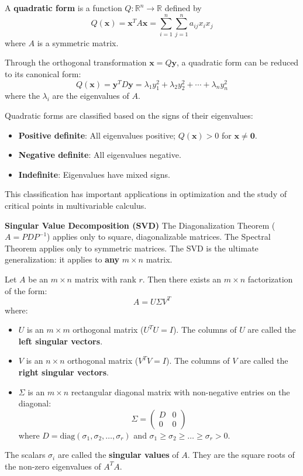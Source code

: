 \begin{definition}
A \textbf{quadratic form} is a function $Q: \mathbb{R}^n \to \mathbb{R}$ defined by
\[
Q(\mathbf{x}) = \mathbf{x}^T A \mathbf{x} = \sum_{i=1}^n \sum_{j=1}^n a_{ij} x_i x_j
\]
where $A$ is a symmetric matrix.
\end{definition}

Through the orthogonal transformation $\mathbf{x} = Q\mathbf{y}$, a quadratic form can be reduced to its canonical form:
\[
Q(\mathbf{x}) = \mathbf{y}^T D \mathbf{y} = \lambda_1 y_1^2 + \lambda_2 y_2^2 + \cdots + \lambda_n y_n^2
\]
where the $\lambda_i$ are the eigenvalues of $A$.

Quadratic forms are classified based on the signs of their eigenvalues:
\begin{itemize}
    \item \textbf{Positive definite}: All eigenvalues positive; $Q(\mathbf{x}) > 0$ for $\mathbf{x} \neq \mathbf{0}$.
    \item \textbf{Negative definite}: All eigenvalues negative.
    \item \textbf{Indefinite}: Eigenvalues have mixed signs.
\end{itemize}

This classification has important applications in optimization and the study of critical points in multivariable calculus.


\textbf{Singular Value Decomposition (SVD)}
The Diagonalization Theorem ($A = PDP^{-1}$) applies only to square, diagonalizable matrices. The Spectral Theorem applies only to symmetric matrices. The SVD is the ultimate generalization: it applies to \textbf{any} $m \times n$ matrix.

\begin{theorem}
Let $A$ be an $m \times n$ matrix with rank $r$. Then there exists an $m \times n$ factorization of the form:
\[ A = U \Sigma V^T \]
where:
\begin{itemize}
    \item $U$ is an $m \times m$ orthogonal matrix ($U^T U = I$). The columns of $U$ are called the \textbf{left singular vectors}.
    \item $V$ is an $n \times n$ orthogonal matrix ($V^T V = I$). The columns of $V$ are called the \textbf{right singular vectors}.
    \item $\Sigma$ is an $m \times n$ rectangular diagonal matrix with non-negative entries on the diagonal:
    \[ \Sigma = \begin{pmatrix} D & 0 \\ 0 & 0 \end{pmatrix} \]
    where $D = \text{diag}(\sigma_1, \sigma_2, \dots, \sigma_r)$ and $\sigma_1 \ge \sigma_2 \ge \dots \ge \sigma_r > 0$.
\end{itemize}
The scalars $\sigma_i$ are called the \textbf{singular values} of $A$. They are the square roots of the non-zero eigenvalues of $A^T A$.
\end{theorem}

